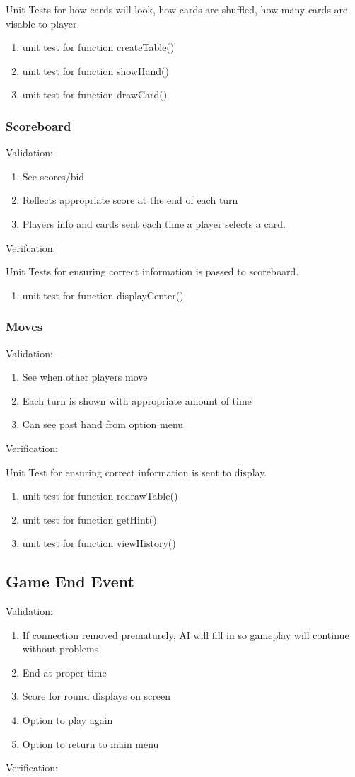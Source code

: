 \documentclass[11pt, titlepage]{article}
\begin{document}
			Unit Tests for how cards will look, how cards are shuffled, how many cards are visable to player.
			\begin{enumerate}
				\item unit test for function createTable()
				\item unit test for function showHand()
				\item unit test for function drawCard()
			\end{enumerate}
			\subsubsection{Scoreboard}
			Validation:
			\begin{enumerate}
				\item See scores/bid
				\item Reflects appropriate score at the end of each turn
				\item Players info and cards sent each time a player selects a card.
			\end{enumerate}
			Verifcation:

			Unit Tests for ensuring correct information is passed to scoreboard.
			\begin{enumerate}
				\item unit test for function displayCenter()
			\end{enumerate}

			\subsubsection{Moves}
			Validation:
			\begin{enumerate}
				\item  See when other players move
				\item  Each turn is shown with appropriate amount of time
				\item  Can see past hand from option menu
			\end{enumerate}
			Verification:

			Unit Test for ensuring correct information is sent to display.
			\begin{enumerate}
				\item unit test for function redrawTable()
				\item unit test for function getHint()
				\item unit test for function viewHistory()
			\end{enumerate}
		\subsection{Game End Event}
			Validation:
			\begin{enumerate}
				\item If connection removed prematurely, AI will fill in so gameplay will continue without problems
				\item End at proper time
				\item Score for round displays on screen
				\item Option to play again
				\item Option to return to main menu
			\end{enumerate}
			Verification:
\end{document}
